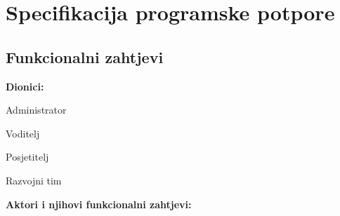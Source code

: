\chapter{Specifikacija programske potpore}
		
	\section{Funkcionalni zahtjevi}
			
			\noindent \textbf{Dionici:}
			
			\begin{packed_enum}
				
				\item Administrator
				\item Voditelj			
				\item Posjetitelj
				\item Razvojni tim
				
			\end{packed_enum}
			
			\noindent \textbf{Aktori i njihovi funkcionalni zahtjevi:}
			
